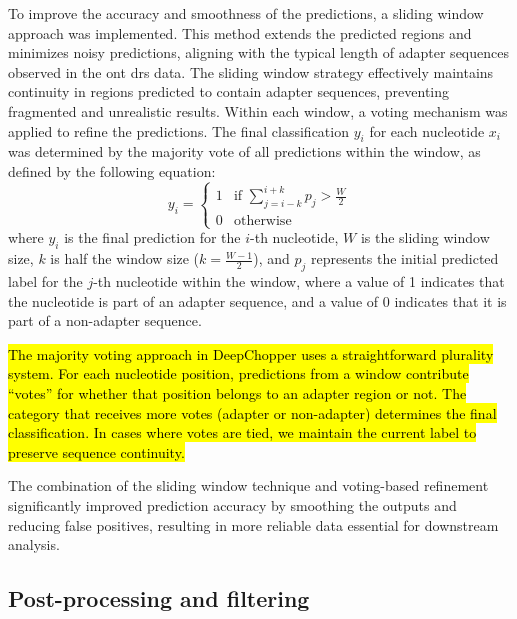 \documentclass[pdflatex,sn-nature, lineno]{sn-jnl}%
\begin{document}
To improve the accuracy and smoothness of the predictions, a sliding window approach was implemented.
This method extends the predicted regions and minimizes noisy predictions, aligning with the typical length of adapter sequences observed in the \gls{ont} \gls{drs} data.
The sliding window strategy effectively maintains continuity in regions predicted to contain adapter sequences, preventing fragmented and unrealistic results.
Within each window, a voting mechanism was applied to refine the predictions.
The final classification $y_i$ for each nucleotide \( x_i \) was determined by the majority vote of all predictions within the window, as defined by the following equation:
\[
	y_i = \begin{cases}
		1 & \text{if } \sum_{j=i-k}^{i+k} p_j > \frac{W}{2} \\
		0 & \text{otherwise}
	\end{cases}
\]
where \(y_i\) is the final prediction for the $i$-th nucleotide, \( W \) is the sliding window size, \( k \) is half the window size (\( k = \frac{W-1}{2}\)), and  \(p_j\) represents the initial predicted label for the \(j\)-th nucleotide within the window, where a value of 1 indicates that the nucleotide is part of an adapter sequence, and a value of 0 indicates that it is part of a non-adapter sequence.

\hl{The majority voting approach in DeepChopper uses a straightforward plurality system.
For each nucleotide position, predictions from a window contribute ``votes'' for whether that position belongs to an adapter region or not.
The category that receives more votes (adapter or non-adapter) determines the final classification.
In cases where votes are tied, we maintain the current label to preserve sequence continuity.}

The combination of the sliding window technique and voting-based refinement significantly improved prediction accuracy by smoothing the outputs and reducing false positives, resulting in more reliable data essential for downstream analysis.

\subsection{Post-processing and filtering}
\end{document}
